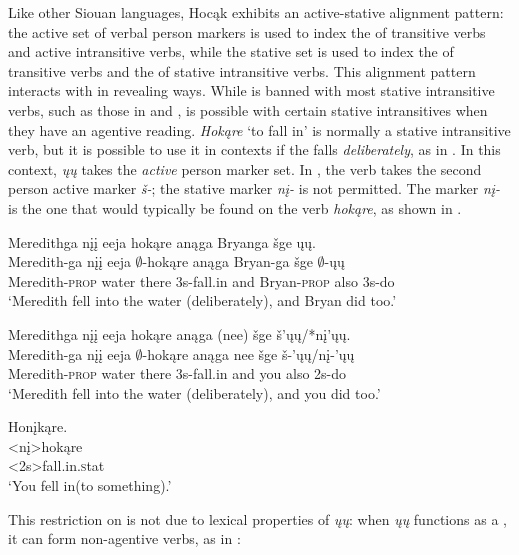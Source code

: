 \documentclass[output=paper]{LSP/langsci}
\begin{document}
Like other Siouan languages, Hocąk exhibits an active-stative alignment pattern: the active set of verbal person markers is used to index the  of transitive verbs and active intransitive verbs, while the stative set is used to index the  of transitive verbs and the  of stative intransitive verbs. This alignment pattern interacts with  in revealing ways. While  is banned with most stative intransitive verbs, such as those in  and ,  is possible with certain stative intransitives when they have an agentive reading. \emph{Hokąre} `to fall in' is normally a stative intransitive verb, but it is possible to use it in  contexts if the  falls \emph{deliberately}, as in . In this context, \emph{ųų} takes the \emph{active} person marker set. In , the verb takes the second person active marker \emph{š-}; the stative marker \emph{nį-} is not permitted. The marker \emph{nį-} is the one that would typically be found on the verb \emph{hokąre}, as shown in .
 
\ea\label{ex:johnson:21}
\ea\label{ex:johnson:21a} 
\glll Meredithga nįį eeja hokąre anąga Bryanga šge ųų.\\
Meredith-ga nįį eeja $\emptyset$-hokąre anąga Bryan-ga šge $\emptyset$-ųų\\
Meredith-\textsc{prop} water there {\textsc 3s}-fall.in and Bryan-\textsc{prop} also {\textsc 3s}-do\\
\trans `Meredith fell into the water (deliberately), and Bryan did too.'
 
\ex\label{ex:johnson:21b} 
\glll Meredithga nįį eeja hokąre anąga (nee) šge š'ųų/*nį'ųų.\\
Meredith-ga nįį eeja $\emptyset$-hokąre anąga nee šge š-'ųų/nį-'ųų\\
Meredith-\textsc{prop} water there {\textsc 3s}-fall.in and you also {\textsc 2s}-do\\
\trans `Meredith fell into the water (deliberately), and you did too.'
\z
\z
 
\ea\label{ex:johnson:22} 
\glll Honįkąre.\\
<nį>hokąre\\
<{\textsc 2s}>fall.in.{\textsc stat}\\
\trans `You fell in(to something).' \citep{Hartmann2012}
\z
	
This restriction on  is not due to lexical properties of \emph{ųų}: when \emph{ųų} functions as a , it can form non-agentive verbs, as in :
\end{document}
